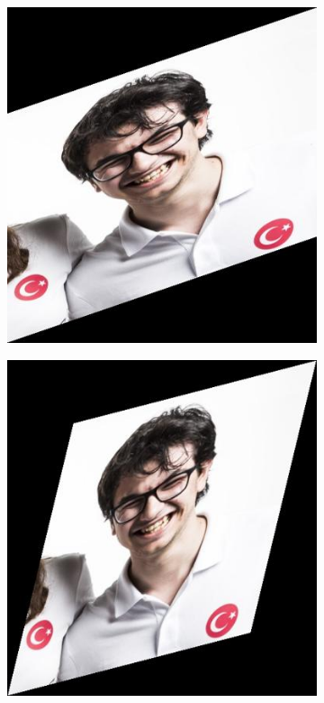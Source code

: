 \documentclass{article}
\begin{document}
\begin{figure}[!htb]
\begin{subfigure}{.25\textwidth}
\end{subfigure}%
\begin{subfigure}{.25\textwidth}
  \centering
  \includegraphics[width=.99\textwidth]{ahmet4.jpg}
\end{subfigure}
\begin{subfigure}{.25\textwidth}
  \centering
  \includegraphics[width=.99\textwidth]{ahmet5.jpg}

\end{subfigure}
\end{figure}
\end{document}

